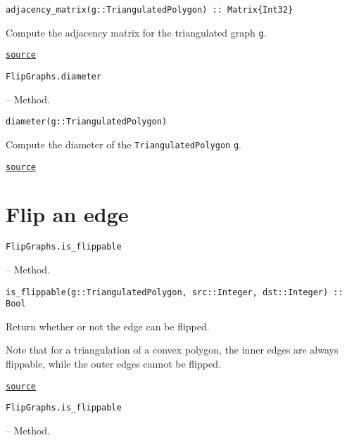 \begin{adjustwidth}{2em}{0pt}


\begin{verbatim}
adjacency_matrix(g::TriangulatedPolygon) :: Matrix{Int32}
\end{verbatim}

Compute the adjacency matrix for the triangulated graph \texttt{g}. 



\href{https://github.com/schto223/FlipGraphs.jl/blob/e35d43698a06b86273148826b79d585ba04fcd26/src/polygonTriangulations.jl#L240-L244}{\texttt{source}}


\end{adjustwidth}
\hypertarget{4612475216183140749}{\texttt{FlipGraphs.diameter}}  -- {Method.}

\begin{adjustwidth}{2em}{0pt}


\begin{verbatim}
diameter(g::TriangulatedPolygon)
\end{verbatim}

Compute the diameter of the \texttt{TriangulatedPolygon} \texttt{g}.



\href{https://github.com/schto223/FlipGraphs.jl/blob/e35d43698a06b86273148826b79d585ba04fcd26/src/polygonTriangulations.jl#L231-L235}{\texttt{source}}


\end{adjustwidth}

\section{Flip an edge}



\label{11197232524932956081}{}

\hypertarget{1509616110747472477}{\texttt{FlipGraphs.is\_flippable}}  -- {Method.}

\begin{adjustwidth}{2em}{0pt}


\begin{verbatim}
is_flippable(g::TriangulatedPolygon, src::Integer, dst::Integer) :: Bool
\end{verbatim}

Return whether or not the edge can be flipped.

Note that for a triangulation of a convex polygon, the inner edges are always flippable,      while the outer edges cannot be flipped.    



\href{https://github.com/schto223/FlipGraphs.jl/blob/e35d43698a06b86273148826b79d585ba04fcd26/src/polygonTriangulations.jl#L209-L216}{\texttt{source}}


\end{adjustwidth}
\hypertarget{2288003655784744554}{\texttt{FlipGraphs.is\_flippable}}  -- {Method.}

